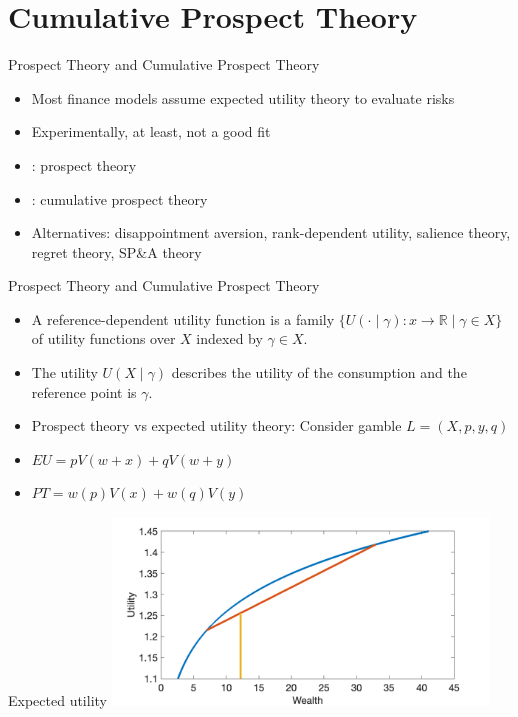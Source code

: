 \section{Cumulative Prospect Theory}
\begin{frame}{Prospect Theory and Cumulative Prospect Theory}
    \begin{itemize}
        \item Most finance models assume expected utility theory to evaluate risks\bigskip
        \item Experimentally, at least, not a good fit\bigskip
        \item \citet{KahnemanTversky1979}: prospect theory\bigskip
        \item \citet{TverskyKahneman1992}: cumulative prospect theory\bigskip
        \item Alternatives: disappointment aversion, rank-dependent utility, salience theory, regret theory, SP\&A theory\bigskip
    \end{itemize}
\end{frame}


\begin{frame}{Prospect Theory and Cumulative Prospect Theory}
    \begin{itemize}
        \item A reference-dependent utility function is a family $\{U(\cdot \mid \gamma):x \longrightarrow \mathbb{R} \mid \gamma \in X\}$  of utility functions over $X$ indexed by $\gamma \in X$.\bigskip
        \item The utility $U(X \mid \gamma)$ describes the utility of the consumption and the reference point is $\gamma$.\bigskip
        \item Prospect theory vs expected utility theory: Consider gamble $L = (X, p, y, q)$\bigskip
        \item  $EU=p V(w +x)+qV(w+y)$\bigskip
       \item $PT=w(p)V(x)+w(q)V(y)$\bigskip
\end{itemize}
\end{frame}


\begin{frame}{Expected utility}
\centering
\includegraphics[width= 0.75\textwidth]{expected_utility}
\end{frame}

